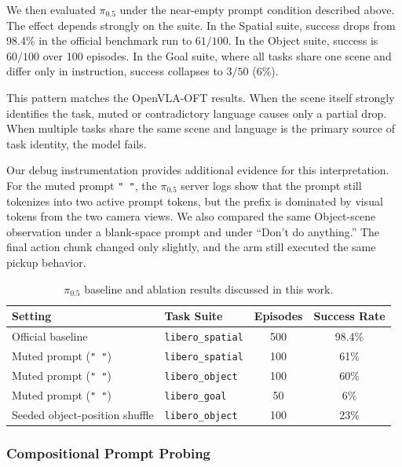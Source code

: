 \documentclass{article}
\begin{document}
We then evaluated $\pi_{0.5}$ under the near-empty prompt condition described above. The effect depends strongly on the suite. In the Spatial suite, success drops from 98.4\% in the official benchmark run to \(61/100\). In the Object suite, success is \(60/100\) over 100 episodes. In the Goal suite, where all tasks share one scene and differ only in instruction, success collapses to \(3/50\) (6\%).

This pattern matches the OpenVLA-OFT results. When the scene itself strongly identifies the task, muted or contradictory language causes only a partial drop. When multiple tasks share the same scene and language is the primary source of task identity, the model fails.

Our debug instrumentation provides additional evidence for this interpretation. For the muted prompt \texttt{" "}, the $\pi_{0.5}$ server logs show that the prompt still tokenizes into two active prompt tokens, but the prefix is dominated by visual tokens from the two camera views. We also compared the same Object-scene observation under a blank-space prompt and under ``Don't do anything.'' The final action chunk changed only slightly, and the arm still executed the same pickup behavior.

\begin{table}[t]
\centering
\caption{$\pi_{0.5}$ baseline and ablation results discussed in this work.}
\label{tab:pi05_ablation}
\begin{tabular}{l l c c}
\toprule
\textbf{Setting} & \textbf{Task Suite} & \textbf{Episodes} & \textbf{Success Rate} \\
\midrule
Official baseline & \texttt{libero\_spatial} & 500 & 98.4\% \\
Muted prompt (\texttt{" "}) & \texttt{libero\_spatial} & 100 & 61\% \\
Muted prompt (\texttt{" "}) & \texttt{libero\_object} & 100 & 60\% \\
Muted prompt (\texttt{" "}) & \texttt{libero\_goal} & 50 & 6\% \\
Seeded object-position shuffle & \texttt{libero\_object} & 100 & 23\% \\
\bottomrule
\end{tabular}
\end{table}

\subsubsection{Compositional Prompt Probing}
\end{document}
